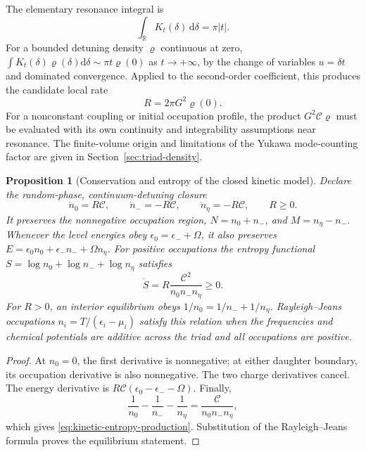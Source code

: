 \documentclass[11pt,a4paper,oneside]{book}
\theoremstyle{plain}
\newtheorem{proposition}[theorem]{Proposition}
\theoremstyle{definition}
\theoremstyle{remark}
\newcommand{\R}{\mathbb R}
\newcommand{\dd}{\mathrm d}
\newcommand{\src}[2]{\cite{#1}}
\begin{document}
The elementary resonance integral is
\begin{equation}
 \int_{\R}K_t(\delta)\,\dd\delta=\pi|t|.
 \label{eq:resonance-integral}
\end{equation}
For a bounded detuning density $\varrho$ continuous at zero,
$\int K_t(\delta)\varrho(\delta)\dd\delta\sim\pi t\varrho(0)$ as
$t\to+\infty$, by the change of variables $u=\delta t$ and dominated
convergence.  Applied to the second-order coefficient, this produces
the candidate local rate
\begin{equation}
 R=2\pi G^2\varrho(0).
 \label{eq:kinetic-local-rate}
\end{equation}
For a nonconstant coupling or initial occupation profile, the product
$G^2\mathcal C\varrho$ must be evaluated with its own continuity and
integrability assumptions near resonance.  The finite-volume origin
and limitations of the Yukawa mode-counting factor are given in
Section~\ref{sec:triad-density}.
\src{R20}{thm:v20v34-rate}

\begin{proposition}[Conservation and entropy of the closed kinetic model]
\label{prop:kinetic-entropy}
Declare the random-phase, continuum-detuning closure
\begin{equation}
 \dot n_0=R\mathcal C,\qquad
 \dot n_-=-R\mathcal C,\qquad
 \dot n_\eta=-R\mathcal C,\qquad R\ge0.
 \label{eq:closed-triad-kinetics}
\end{equation}
It preserves the nonnegative occupation region, $N=n_0+n_-$, and
$M=n_\eta-n_-$.  Whenever the level energies obey
$\epsilon_0=\epsilon_-+\Omega$, it also preserves
$E=\epsilon_0n_0+\epsilon_-n_-+\Omega n_\eta$.
For positive occupations the entropy functional
$S=\log n_0+\log n_-+\log n_\eta$ satisfies
\begin{equation}
 \dot S=R\frac{\mathcal C^2}{n_0n_-n_\eta}\ge0.
 \label{eq:kinetic-entropy-production}
\end{equation}
For $R>0$, an interior equilibrium obeys
$1/n_0=1/n_-+1/n_\eta$.  Rayleigh--Jeans occupations
$n_i=T/(\epsilon_i-\mu_i)$ satisfy this relation when the frequencies
and chemical potentials are additive across the triad and all
occupations are positive.
\end{proposition}
\begin{proof}
At $n_0=0$, the first derivative is nonnegative; at either daughter
boundary, its occupation derivative is also nonnegative.  The two
charge derivatives cancel.  The energy derivative is
$R\mathcal C(\epsilon_0-\epsilon_--\Omega)$.  Finally,
\[
 \frac1{n_0}-\frac1{n_-}-\frac1{n_\eta}
 =\frac{\mathcal C}{n_0n_-n_\eta},
\]
which gives \eqref{eq:kinetic-entropy-production}.  Substitution of the
Rayleigh--Jeans formula proves the equilibrium statement.
\end{proof}
\src{R20}{thm:v20v34-H}
\end{document}
